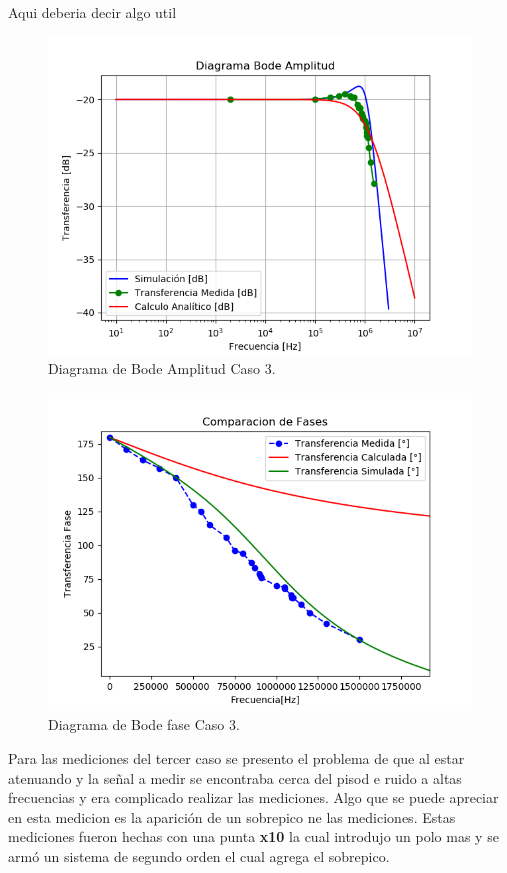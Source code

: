 Aqui deberia decir algo util
\begin{figure}[H]	
	\centering
	\includegraphics[width=\textwidth]{Ejercicio1/Imagenes/BodeC3.png}
	\caption{Diagrama de Bode Amplitud Caso 3.}
	\label{fig:BodeC3}
\end{figure} 
\begin{figure}[H]	
	\centering
	\includegraphics[width=\textwidth]{Ejercicio1/Imagenes/BodephC3.png}
	\caption{Diagrama de Bode fase Caso 3.}
	\label{fig:BodephC3}
\end{figure} 
Para las mediciones del tercer caso se presento el problema de que al estar atenuando y la señal a medir se encontraba cerca del pisod e ruido a altas frecuencias y era complicado realizar las mediciones. Algo que se puede apreciar en esta medicion es la aparición de un sobrepico ne las mediciones. Estas mediciones fueron hechas con una punta \textbf{x10} la cual introdujo un polo mas y se armó un sistema de segundo orden el cual agrega el sobrepico.
